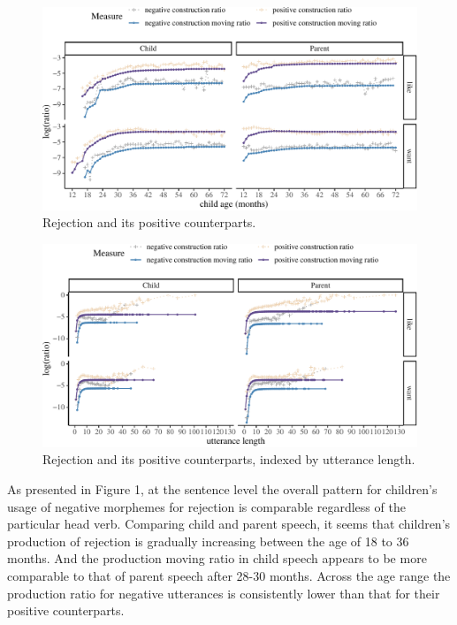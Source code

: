 \documentclass[
  english,
  man,floatsintext]{apa6}
\begin{document}
\begin{figure}[H]

{\centering \includegraphics{neg_construction_article_files/figure-latex/emotion-1} 

}

\caption{Rejection and its positive counterparts.}\label{fig:emotion}
\end{figure}

\begin{figure}[H]

{\centering \includegraphics{neg_construction_article_files/figure-latex/emotionul-1} 

}

\caption{Rejection and its positive counterparts, indexed by utterance length.}\label{fig:emotionul}
\end{figure}

As presented in Figure 1, at the sentence level the overall pattern for children's usage of negative morphemes for rejection is comparable regardless of the particular head verb. Comparing child and parent speech, it seems that children's production of rejection is gradually increasing between the age of 18 to 36 months. And the production moving ratio in child speech appears to be more comparable to that of parent speech after 28-30 months. Across the age range the production ratio for negative utterances is consistently lower than that for their positive counterparts.
\end{document}
